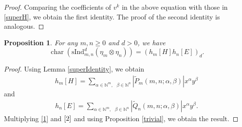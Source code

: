 \documentclass[12pt,reqno]{amsart}
\newtheorem{proposition}[theorem]{Proposition}
\theoremstyle{definition}
\theoremstyle{remark}
\newcommand{\ind}{\mathrm{sInd}_{m,n}^{d}}
\DeclareMathOperator{\ch}{char}
\begin{document}
\begin{proof}
Comparing the coefficients of $v^k$ in the above equation with those in \eqref{superH}, we obtain the first identity. The proof of the second identity is analogous.
\end{proof}
\begin{proposition}\label{lem2} For any $m,n\geq 0$ and $d>0$, we have
$$\ch(\ind(\eta_{m}\otimes \eta_{n}))=(h_{m}[H]h_{n}[E])_{d}.$$
\end{proposition}
\begin{proof}
Using Lemma \ref{superIdentity}, we obtain
\begin{align}\label{1}
    h_{m}[H]=\sum_{\alpha\in\mathbb{N}^{m},\text{ }\beta\in\mathbb{N}^{n}}|\tilde{P}_{m}(m,n;\alpha,\beta)|x^{\alpha}y^{\beta}
\end{align} and 
\begin{align}\label{2}
    h_{n}[E]=\sum_{\alpha\in\mathbb{N}^{m},\text{ } \beta\in\mathbb{N}^{n}}|\tilde{Q}_{n}(m,n;\alpha,\beta)|x^{\alpha}y^{\beta}.
\end{align}
Multiplying \eqref{1} and $\eqref{2}$ and using Proposition \ref{trivial}, we obtain the result. 
\end{proof}
\end{document}
